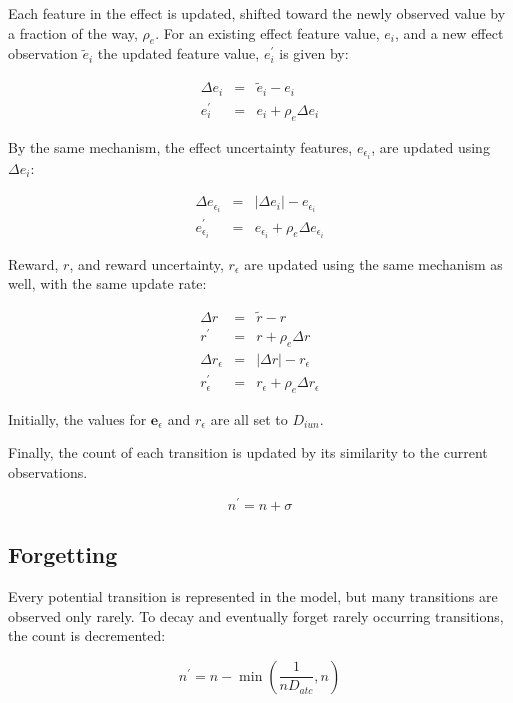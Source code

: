 Each feature in the effect is updated, shifted toward the newly observed value by a fraction of the way, $\rho_e$. For an existing effect feature value, $e_i$, and a new effect observation $\tilde{e}_i$ the updated feature value, $e^\prime_i$ is given by:

\begin{eqnarray}
\Delta e_i &= &\tilde{e}_i  - e_i \\
e^\prime_i &=& e_i + \rho_e \Delta e_i
\end{eqnarray}

By the same mechanism, the effect uncertainty features, $e_{\epsilon_i}$, are updated using $\Delta e_i$:

\begin{eqnarray}
\Delta e_{\epsilon_i} &=& |\Delta e_i|  - e_{\epsilon_i}\\
e_{\epsilon_i}^\prime &=& e_{\epsilon_i} + \rho_e \Delta e_{\epsilon_i}
\end{eqnarray}

Reward, $r$, and reward uncertainty, $r_\epsilon$ are updated using the same mechanism as well, with the same update rate:

\begin{eqnarray}
\Delta r &= &\tilde{r} - r \\
r^\prime &=& r + \rho_e \Delta r \\
\Delta r_\epsilon &=&|\Delta r| -  r_\epsilon \\
r_\epsilon^\prime &=& r_\epsilon + \rho_e \Delta r_\epsilon
\end{eqnarray}

Initially, the values for $\mathbf{e}_{\epsilon}$ and $r_{\epsilon}$ are all set to $D_{iun}$. 

Finally, the count of each transition is updated by its similarity to the current observations.

\begin{equation}
n^{\prime} = n + \sigma
\end{equation}


\subsection{Forgetting}
Every potential transition is represented in the model, but many transitions are observed only rarely. To decay and eventually forget rarely occurring transitions, the count is decremented:

\begin{equation}
n^\prime = n - \min \left ( \frac{1}{n D_{atc}}, n \right )
\end{equation}

